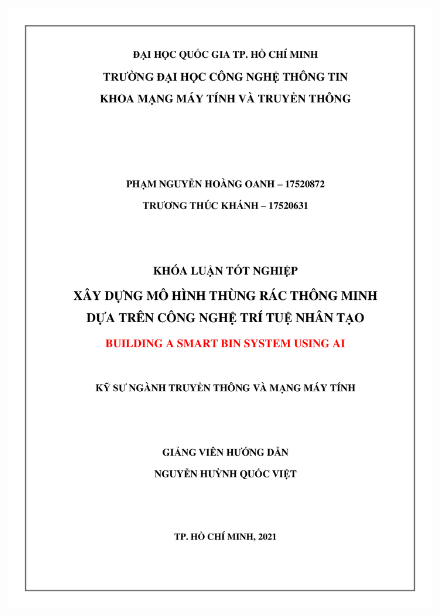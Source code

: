 \begin{figure}[H]
    \centering
    \includegraphics[width=\textwidth]{images/Sub_Cover.jpg}
\end{figure}